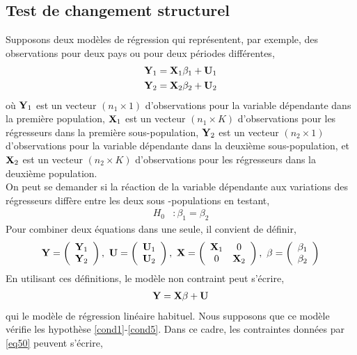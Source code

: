\subsection{Test de changement structurel}
Supposons deux modèles de régression qui représentent, par exemple, des observations pour deux pays ou pour  deux périodes différentes,
\begin{align*}
\mathbf Y_1 &= \mathbf X_1\beta_1 + \mathbf U_1\\
\mathbf Y_2 &= \mathbf X_2\beta_2 + \mathbf U_2
\end{align*}
où $\mathbf Y_1$ est un vecteur $(n_1\times 1)$ d'observations pour la variable dépendante dans la première population, $\mathbf X_1$ est un vecteur $(n_1\times K)$ d'observations pour les régresseurs dans la première sous-population,  $\mathbf Y_2$ est un vecteur $(n_2\times 1)$ d'observations pour la variable dépendante dans la deuxième sous-population, et $\mathbf X_2$ est un vecteur $(n_2\times K)$ d'observations pour les régresseurs dans la deuxième population.\\
On peut se demander si la réaction de la variable dépendante aux variations des régresseurs diffère entre les deux sous -populations en testant,
\begin{align}
H_0 &: \beta_1=\beta_2
\label{eq50}
\end{align}
Pour combiner deux équations dans une seule, il convient de définir,
\begin{align*}
\boldY = 
\left(
\begin{array}{c}
\boldY_1\\
\boldY_2
\end{array}
\right)
, \ 
\boldU = 
\left(
\begin{array}{c}
\boldU_1\\
\boldU_2
\end{array}
\right)
, \
\boldX = 
\left(
\begin{array}{cc}
\boldX_1&0\\
0&\boldX_2
\end{array}
\right)
, \
\beta = 
\left(
\begin{array}{c}
\beta_1\\
\beta_2
\end{array}
\right)
\end{align*}
En utilisant ces définitions, le modèle non contraint peut s'écrire,
\begin{align}
\mathbf Y = \mathbf X\beta + \mathbf U
\label{eq51}
\end{align}
qui le modèle de régression linéaire habituel. Nous supposons que ce modèle vérifie les hypothèse \ref{cond1}-\ref{cond5}. Dans ce cadre, les contraintes données par \eqref{eq50} peuvent s'écrire,
